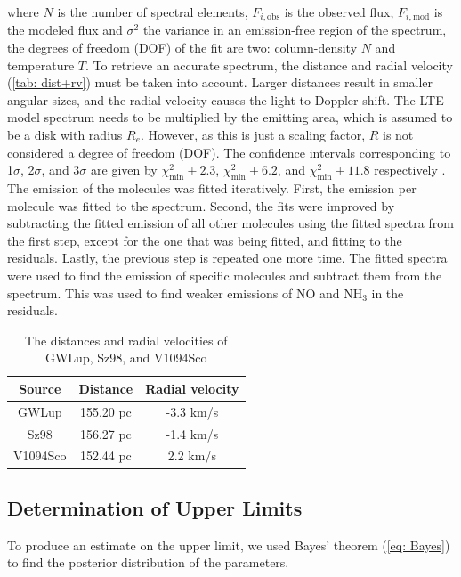 \documentclass[oneside, single, authoryear, semicolon, 12pt]{lion-msc}
\newcommand{\4}{$_4$}
\newcommand{\3}{$_3$}
\newcommand{\2}{$_2$}
\begin{document}
where $N$ is the number of spectral elements, $F_{i,\mathrm{obs}}$ is the observed flux, $F_{i,\mathrm{mod}}$ is the modeled flux and $\sigma^2$ the variance in an emission-free region of the spectrum, the degrees of freedom (DOF) of the fit are two: column-density $N$ and temperature $T$. To retrieve an accurate spectrum, the distance and radial velocity (\autoref{tab: dist+rv}) must be taken into account. Larger distances result in smaller angular sizes, and the radial velocity causes the light to Doppler shift. The LTE model spectrum needs to be multiplied by the emitting area, which is assumed to be a disk with radius $R_e$. However, as this is just a scaling factor, $R$ is not considered a degree of freedom (DOF). The confidence intervals corresponding to 1$\sigma$, 2$\sigma$, and 3$\sigma$ are given by $\chi^2_{\mathrm{min}}+2.3$, $\chi^2_{\mathrm{min}}+6.2$, and $\chi^2_{\mathrm{min}}+11.8$ respectively \citep{pressetal, Avnietal}. The emission of the molecules was fitted iteratively. First, the emission per molecule was fitted to the spectrum. Second, the fits were improved by subtracting the fitted emission of all other molecules using the fitted spectra from the first step, except for the one that was being fitted, and fitting to the residuals. Lastly, the previous step is repeated one more time. 
The fitted spectra were used to find the emission of specific molecules and subtract them from the spectrum. This was used to find weaker emissions of NO and NH\3 in the residuals. 

\begin{table}[H]
\centering
\begin{tabular}{ccc}
\hline
Source   & \makecell{Distance \\\citep{henning2024mindsjwstmirimidinfrared}}  & \makecell{Radial velocity \\ \citep{Frasca_2017}} \\ \hline
GWLup    & 155.20 pc & -3.3 km/s       \\
Sz98     & 156.27 pc & -1.4 km/s       \\
V1094Sco & 152.44 pc & 2.2 km/s        \\ \hline
\end{tabular}
\caption{The distances and radial velocities of GWLup, Sz98, and V1094Sco}
\label{tab: dist+rv}
\end{table}

\newpage
\subsection{Determination of Upper Limits}
To produce an estimate on the upper limit, we used Bayes' theorem (\autoref{eq: Bayes}) to find the posterior distribution of the parameters. 
\end{document}
